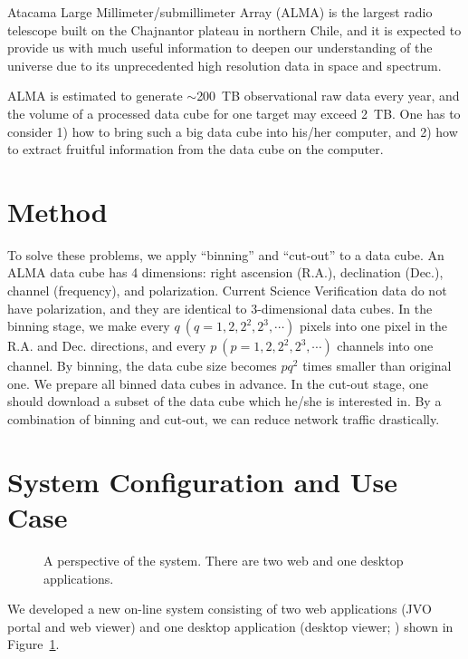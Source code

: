 Atacama Large Millimeter/submillimeter Array (ALMA) is the largest radio telescope built on the Chajnantor plateau in northern Chile, and it is expected to provide us with much useful information to deepen our understanding of the universe due to its unprecedented high resolution data in space and spectrum.

ALMA is estimated to generate $\sim$200\ TB observational raw data every year, and the volume of a processed data cube for one target may exceed 2\ TB. One has to consider 1) how to bring such a big data cube into his/her computer, and 2) how to extract fruitful information from the data cube on the computer.

\section{Method}

To solve these problems, we apply ``binning'' and ``cut-out'' to a data cube. An ALMA data cube has 4 dimensions: right ascension (R.A.), declination (Dec.), channel (frequency), and polarization. Current Science Verification data do not have polarization, and they are identical to 3-dimensional data cubes. In the binning stage, we make every $q \ (q = 1, 2, 2^{2}, 2^{3}, \cdots)$ pixels into one pixel in the R.A. and Dec. directions, and every $p \ (p = 1, 2, 2^{2}, 2^{3}, \cdots)$ channels into one channel. By binning, the data cube size becomes $p q^{2}$ times smaller than original one. We prepare all binned data cubes in advance. In the cut-out stage, one should download a subset of the data cube which he/she is interested in. By a combination of binning and cut-out, we can reduce network traffic drastically.

\section{System Configuration and Use Case}

\begin{figure}
	\caption{A perspective of the system. There are two web and one desktop applications.
	\label{O10_f1}}
\end{figure}

We developed a new on-line system \citep{D5_adassxxii} consisting of two web applications (JVO portal and web viewer) and one desktop application (desktop viewer; \citealt{P047_adassxxii}) shown in Figure~\ref{O10_f1}.

